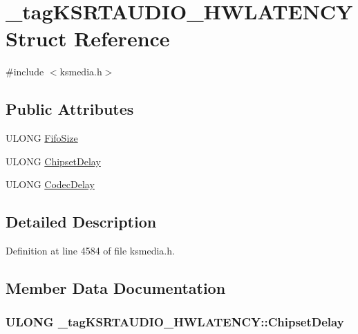 \hypertarget{struct__tag_k_s_r_t_a_u_d_i_o___h_w_l_a_t_e_n_c_y}{}\section{\+\_\+tag\+K\+S\+R\+T\+A\+U\+D\+I\+O\+\_\+\+H\+W\+L\+A\+T\+E\+N\+CY Struct Reference}
\label{struct__tag_k_s_r_t_a_u_d_i_o___h_w_l_a_t_e_n_c_y}


{\ttfamily \#include $<$ksmedia.\+h$>$}

\subsection*{Public Attributes}
\begin{DoxyCompactItemize}
\item 
U\+L\+O\+NG \hyperlink{struct__tag_k_s_r_t_a_u_d_i_o___h_w_l_a_t_e_n_c_y_a1270423fb3d0b206b98c0514bbfaa01b}{Fifo\+Size}
\item 
U\+L\+O\+NG \hyperlink{struct__tag_k_s_r_t_a_u_d_i_o___h_w_l_a_t_e_n_c_y_a7dcbb63676244690cc76faa8278f79b6}{Chipset\+Delay}
\item 
U\+L\+O\+NG \hyperlink{struct__tag_k_s_r_t_a_u_d_i_o___h_w_l_a_t_e_n_c_y_ab3fb71ad1e0dbf27f01505cabbd16ad3}{Codec\+Delay}
\end{DoxyCompactItemize}


\subsection{Detailed Description}


Definition at line 4584 of file ksmedia.\+h.



\subsection{Member Data Documentation}
\subsubsection[{\texorpdfstring{Chipset\+Delay}{ChipsetDelay}}]{\setlength{\rightskip}{0pt plus 5cm}U\+L\+O\+NG \+\_\+tag\+K\+S\+R\+T\+A\+U\+D\+I\+O\+\_\+\+H\+W\+L\+A\+T\+E\+N\+C\+Y\+::\+Chipset\+Delay}\hypertarget{struct__tag_k_s_r_t_a_u_d_i_o___h_w_l_a_t_e_n_c_y_a7dcbb63676244690cc76faa8278f79b6}{}\label{struct__tag_k_s_r_t_a_u_d_i_o___h_w_l_a_t_e_n_c_y_a7dcbb63676244690cc76faa8278f79b6}


